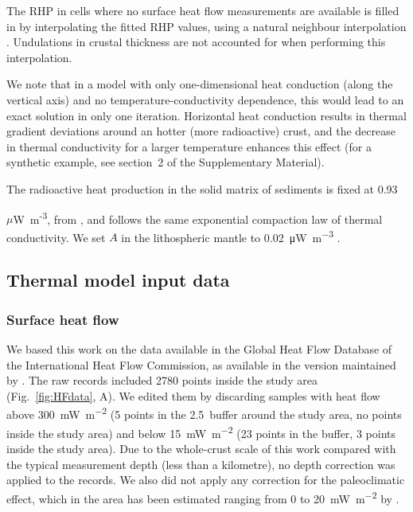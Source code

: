 The RHP in cells where no surface heat flow measurements are available is filled in by interpolating the fitted RHP values, using a natural neighbour interpolation \parencite{Sibson1981}.
Undulations in crustal thickness are not accounted for when performing this interpolation.

We note that in a model with only one-dimensional heat conduction (along the vertical axis) and no temperature-conductivity dependence, this would lead to an exact solution in only one iteration.
Horizontal heat conduction results in thermal gradient deviations around an hotter (more radioactive) crust, and the decrease in thermal conductivity for a larger temperature enhances this effect (for a synthetic example, see section~2 of the Supplementary Material).

The radioactive heat production in the solid matrix of sediments is fixed at 0.93~{$\mu$W~m\textsuperscript{-3}, from \textcite{Vila2010}, and follows the same exponential compaction law of thermal conductivity.
We set $A$ in the lithospheric mantle to \SI{0.02}{\micro \watt \per \cubic \metre} \parencite{Hasterok2011cont}.

\subsection{Thermal model input data}
\label{ss:Appl:ThermInput}

\subsubsection{Surface heat flow}
\label{sss:ThermInputSHF}

We based this work on the data available in the Global Heat Flow Database of the International Heat Flow Commission, as available in the version maintained by \textcite{globalHF}.
The raw records included 2780 points inside the study area (Fig.~\ref{fig:HFdata}, A).
We edited them by discarding samples with heat flow above 300~\si{\milli \watt \per \square \metre} (5 points in the 2.5\textdegree~buffer around the study area, no points inside the study area) and below 15~\si{\milli \watt \per \square \metre} (23 points in the buffer, 3 points inside the study area).
Due to the whole-crust scale of this work compared with the typical measurement depth (less than a kilometre), no depth correction was applied to the records.
We also did not apply any correction for the paleoclimatic effect, which in the area has been estimated ranging from 0 to 20~\si{\milli \watt \per \square \metre} by \textcite{Majorowicz2011}.

}
